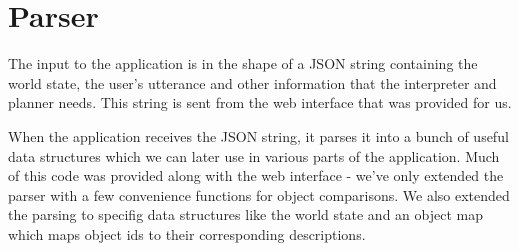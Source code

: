 \section*{Parser}
The input to the application is in the shape of a JSON string containing the world state, the user's utterance and other information that the interpreter and planner needs.
This string is sent from the web interface that was provided for us.

When the application receives the JSON string, it parses it into a bunch of useful data structures which we can later use in various parts of the application.
Much of this code was provided along with the web interface - we've only extended the parser with a few convenience functions for object comparisons.
We also extended the parsing to specifig data structures like the world state and an object map which maps object ids to their corresponding descriptions.

